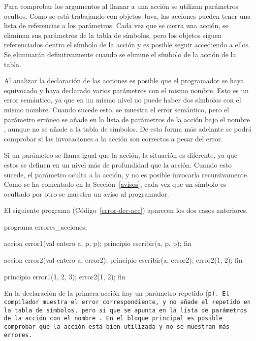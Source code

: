 Para comprobar los argumentos al llamar a una acción se utilizan parámetros ocultos. Como se está trabajando con objetos Java, las acciones pueden tener una lista de referencias a los parámetros. Cada vez que se cierra una acción, se eliminan sus parámetros de la tabla de símbolos, pero los objetos siguen referenciados dentro el símbolo de la acción y es posible seguir accediendo a ellos. Se eliminarán definitivamente cuando se elimine el símbolo de la acción de la tabla.

Al analizar la declaración de las acciones es posible que el programador se haya equivocado y haya declarado varios parámetros con el mismo nombre. Esto es un error semántico, ya que en un mismo nivel no puede haber dos símbolos con el mismo nombre. Cuando sucede esto, se muestra el error semántico, pero el parámetro erróneo se añade en la lista de parámetros de la acción bajo el nombre , aunque no se añade a la tabla de símbolos. De esta forma más adelante se podrá comprobar si las invocaciones a la acción son correctas a pesar del error.

Si un parámetro se llama igual que la acción, la situación es diferente, ya que estos se definen en un nivel más de profundidad que la acción. Cuando esto sucede, el parámetro oculta a la acción, y no es posible invocarla recursivamente. Como se ha comentado en la Sección~\ref{avisos}, cada vez que un símbolo es ocultado por otro se muestra un aviso al programador.

El siguiente programa (Código~\ref{error-dec-acc}) aparecen los dos casos anteriores.

\begin{codigo}[style=minileng, caption={Programa \tt{errores\_acciones}.}, label={error-dec-acc}]
programa errores_acciones;

accion error1(val entero a, p, p);
principio
    escribir(a, p, p);
fin

accion error2(val entero a, error2);
principio
    escribir(a, error2);
    error2(1, 2);
fin

principio
    error1(1, 2, 3);
    error2(1, 2);
fin
\end{codigo}

En la declaración de la primera acción hay un parámetro repetido (\tt{p}). El compilador muestra el error correspondiente, y no añade el repetido en la tabla de símbolos, pero si que se apunta en la lista de parámetros de la acción con el nombre . En el bloque principal es posible comprobar que la acción está bien utilizada y no se muestran más errores.

